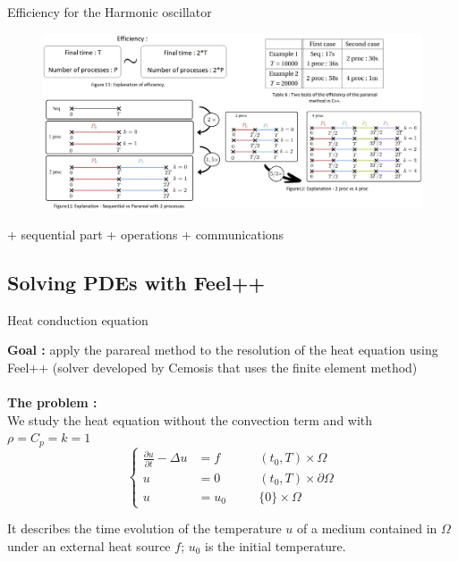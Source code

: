 \begin{frame}{Efficiency for the Harmonic oscillator}
	\begin{figure}
		\centering
		\includegraphics[width=\linewidth]{"images/parareal/efficiency.jpg"}
	\end{figure}
	+ sequential part + operations + communications
\end{frame}

\subsection{Solving PDEs with Feel++}

\begin{frame}{Heat conduction equation}
	
	\textbf{Goal : } apply the parareal method to the resolution of the heat equation using Feel++ (solver developed by Cemosis that uses the finite element method) \\ \; \\
	
	\textbf{The problem :} \\
	We study the heat equation without the convection term and with $\rho=C_p=k=1$
	$$\left\{\begin{aligned}
		\frac{\partial u}{\partial t}-\Delta u &= f \quad&&(t_0,T)\times\Omega \\
		u&=0 \quad&&(t_0,T)\times\partial\Omega\\
		u&=u_0 \quad &&\{0\}\times\Omega
	\end{aligned}\right.$$

	It describes the time evolution of the temperature $u$ of a medium contained in $\Omega$ under an external heat source $f$; $u_0$ is the initial temperature.
	
\end{frame}

